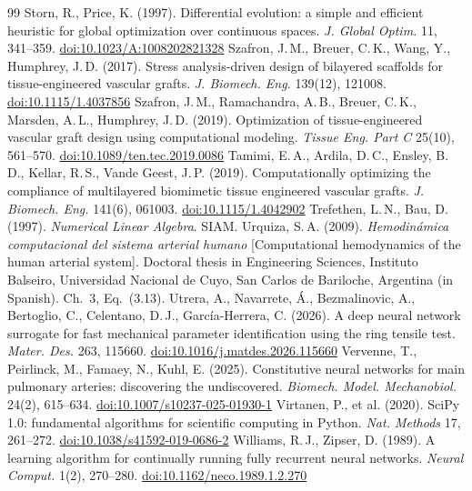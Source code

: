 \begin{thebibliography}{99}
 Storn, R., Price, K. (1997). Differential evolution: a simple and efficient heuristic for global optimization over continuous spaces. \emph{J. Global Optim.} 11, 341--359. \href{https://doi.org/10.1023/A:1008202821328}{doi:10.1023/A:1008202821328}
 Szafron, J.\,M., Breuer, C.\,K., Wang, Y., Humphrey, J.\,D. (2017). Stress analysis-driven design of bilayered scaffolds for tissue-engineered vascular grafts. \emph{J. Biomech. Eng.} 139(12), 121008. \href{https://doi.org/10.1115/1.4037856}{doi:10.1115/1.4037856}
 Szafron, J.\,M., Ramachandra, A.\,B., Breuer, C.\,K., Marsden, A.\,L., Humphrey, J.\,D. (2019). Optimization of tissue-engineered vascular graft design using computational modeling. \emph{Tissue Eng. Part C} 25(10), 561--570. \href{https://doi.org/10.1089/ten.tec.2019.0086}{doi:10.1089/ten.tec.2019.0086}
 Tamimi, E.\,A., Ardila, D.\,C., Ensley, B.\,D., Kellar, R.\,S., Vande Geest, J.\,P. (2019). Computationally optimizing the compliance of multilayered biomimetic tissue engineered vascular grafts. \emph{J. Biomech. Eng.} 141(6), 061003. \href{https://doi.org/10.1115/1.4042902}{doi:10.1115/1.4042902}
 Trefethen, L.\,N., Bau, D. (1997). \emph{Numerical Linear Algebra}. SIAM.
 Urquiza, S.\,A. (2009). \emph{Hemodinámica computacional del sistema arterial humano} [Computational hemodynamics of the human arterial system]. Doctoral thesis in Engineering Sciences, Instituto Balseiro, Universidad Nacional de Cuyo, San Carlos de Bariloche, Argentina (in Spanish). Ch.~3, Eq.~(3.13).
 Utrera, A., Navarrete, \'A., Bezmalinovic, A., Bertoglio, C., Celentano, D.\,J., García-Herrera, C. (2026). A deep neural network surrogate for fast mechanical parameter identification using the ring tensile test. \emph{Mater. Des.} 263, 115660. \href{https://doi.org/10.1016/j.matdes.2026.115660}{doi:10.1016/j.matdes.2026.115660}
 Vervenne, T., Peirlinck, M., Famaey, N., Kuhl, E. (2025). Constitutive neural networks for main pulmonary arteries: discovering the undiscovered. \emph{Biomech. Model. Mechanobiol.} 24(2), 615--634. \href{https://doi.org/10.1007/s10237-025-01930-1}{doi:10.1007/s10237-025-01930-1}
 Virtanen, P., et al. (2020). SciPy 1.0: fundamental algorithms for scientific computing in Python. \emph{Nat. Methods} 17, 261--272. \href{https://doi.org/10.1038/s41592-019-0686-2}{doi:10.1038/s41592-019-0686-2}
 Williams, R.\,J., Zipser, D. (1989). A learning algorithm for continually running fully recurrent neural networks. \emph{Neural Comput.} 1(2), 270--280. \href{https://doi.org/10.1162/neco.1989.1.2.270}{doi:10.1162/neco.1989.1.2.270}
\end{thebibliography}

